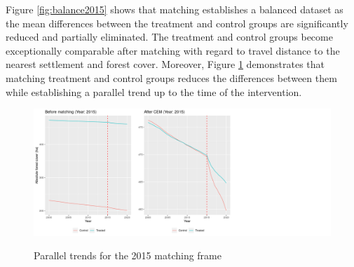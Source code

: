 \documentclass{article}
\begin{document}
Figure \ref{fig:balance2015} shows that matching establishes a balanced dataset as the mean differences between the treatment and control groups are significantly reduced and partially eliminated. The treatment and control groups become exceptionally comparable after matching with regard to travel distance to the nearest settlement and forest cover. Moreover, Figure \ref{fig:parallel2015} demonstrates that matching treatment and control groups reduces the differences between them while establishing a parallel trend up to the time of the intervention.
% 







\begin{figure}[H]
\centering
\caption{Parallel trends for the 2015 matching frame}
\includegraphics[width=1.3\linewidth]{"figures/create plots before after matching-1"}
\label{fig:parallel2015}
\end{figure}
\end{document}
